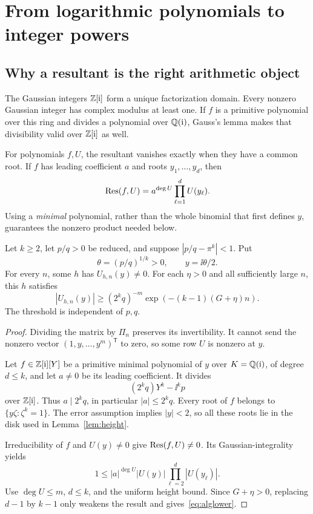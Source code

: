\section{From logarithmic polynomials to integer powers}
\label{sec:transfer}

\subsection{Why a resultant is the right arithmetic object}

The Gaussian integers \(\mathbb Z[\mathrm{i}]\) form a unique factorization
domain. Every nonzero Gaussian integer has complex modulus at least
one. If \(f\) is a primitive polynomial over this ring and divides a
polynomial over \(\mathbb Q(\mathrm{i})\), Gauss's lemma makes that divisibility
valid over \(\mathbb Z[\mathrm{i}]\) as well.

For polynomials \(f,U\), the resultant vanishes exactly when they
have a common root. If \(f\) has leading coefficient \(a\) and
roots \(y_1,\ldots,y_d\), then
\[
\operatorname{Res}(f,U)=a^{\deg U}\prod_{\ell=1}^{d}U(y_\ell).
\]
Using a \emph{minimal} polynomial, rather than the whole binomial
that first defines \(y\), guarantees the nonzero product needed below.

\begin{lemma}\label{lem:resultant}
Let \(k\ge2\), let \(p/q>0\) be reduced, and suppose
\(|p/q-\pi^k|<1\). Put
\[
\theta=(p/q)^{1/k}>0,\qquad y=\ii\theta/2.
\]
For every \(n\), some \(h\) has \(U_{h,n}(y)\ne0\).
For each \(\eta>0\) and all sufficiently large \(n\),
this \(h\) satisfies
\begin{equation}\label{eq:alglower}
|U_{h,n}(y)|\ge
(2^kq)^{-m}\exp(-(k-1)(G+\eta)n).
\end{equation}
The threshold is independent of \(p,q\).
\end{lemma}
\begin{proof}
Dividing the matrix by \(\Pi_n\) preserves its invertibility.
It cannot send the nonzero vector \((1,y,\ldots,y^m)^{\mathsf T}\)
to zero, so some row \(U\) is nonzero at \(y\).

Let \(f\in\mathbb Z[\mathrm{i}][Y]\) be a primitive minimal polynomial of \(y\)
over \(K=\mathbb Q(\mathrm{i})\), of degree \(d\le k\), and let \(a\ne0\)
be its leading coefficient. It divides
\[
(2^kq)Y^k-\ii^k p
\]
over \(\mathbb Z[\mathrm{i}]\). Thus \(a\mid2^kq\), in particular
\(|a|\le2^kq\). Every root of \(f\) belongs to
\(\{y\zeta:\zeta^k=1\}\). The error assumption implies
\(|y|<2\), so all these roots lie in the disk used in
Lemma~\ref{lem:height}.

Irreducibility of \(f\) and \(U(y)\ne0\) give
\(\operatorname{Res}(f,U)\ne0\). Its Gaussian-integrality yields
\[
1\le |a|^{\deg U}|U(y)|
\prod_{\ell=2}^{d}|U(y_\ell)|.
\]
Use \(\deg U\le m\), \(d\le k\), and the uniform height bound.
Since \(G+\eta>0\), replacing \(d-1\) by \(k-1\) only weakens
the result and gives~\eqref{eq:alglower}.
\end{proof}

